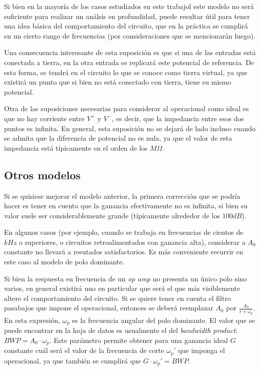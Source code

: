 \documentclass[main.tex]{subfiles}
\begin{document}
Si bien en la mayor\'ia de los casos estudiados en este trabajol este modelo no ser\'a suficiente para realizar un an\'alsis en profundidad, puede resultar \'util para tener una idea b\'asica del comportamiento del circuito, que en la pr\'actica se cumplir\'a en un cierto rango de frecuencias (por consideraciones que se mencionar\'an luego). \par

Una consecuencia interesante de esta suposici\'on es que si una de las entradas est\'a conectada a tierra, en la otra entrada se replicar\'a este potencial de referencia. De esta forma, se tendr\'a en el circuito lo que se conoce como tierra virtual, ya que existir\'a un punto que si bien no est\'a conectado con tierra, tiene su mismo potencial. \par


Otra de las suposiciones necesarias para considerar al operacional como ideal es que no hay corriente entre $V^+$ y $V^-$, es decir, que la impedancia entre esos dos puntos es infinita. En general, esta suposici\'on no se dejar\'a de lado incluso cuando se admita que la diferencia de potencial no es nula, ya que el valor de esta impedancia est\'a t\'ipicamente en el orden de los $M\Omega$.\par


\subsection{Otros modelos}

Si se quisiese mejorar el modelo anterior, la primera correcci\'on que se podr\'ia hacer es tener en cuenta que la ganancia efectivamente no es infinita, si bien su valor suele ser considerablemente grande (t\'ipicamente alrededor de los $100dB$). \par

En algunos casos (por ejemplo, cuando se trabaja en frecuencias de cientos de $kHz$ o superiores, o circuitos retroalimentados con ganancia alta), considerar a $A_0$ constante no llevar\'a a resutados satisfactorios. Es m\'as conveniente recurrir en este caso al modelo de polo dominante.\par

Si bien la respuesta en frecuencia de un \textit{op amp} no presenta un \'unico polo sino varios, en general existir\'a uno en particular que ser\'a el que m\'as visiblemente altere el comportamiento del circuito. Si se quiere tener en cuenta el filtro pasabajos que impone el operacional, entonces se deber\'a reemplazar $A_0$ por $\frac{A_0}{s+\omega_p}$. En esta expresi\'on, $\omega_p$ es la frecuencia angular del polo dominante. El valor que se puede encontrar en la hoja de datos es usualmente el del \textit{bandwidth product}: $BWP=A_0 \cdot \omega_p$. Este par\'ametro permite obtener para una ganancia ideal $G$ constante cu\'al ser\'a el valor de la frecuencia de corte $\omega_p'$ que imponga el operacional, ya que tambi\'en se cumplir\'a que $G \cdot \omega_p' = BWP$.\par
\end{document}
